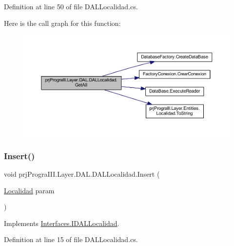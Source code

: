 Definition at line 50 of file D\+A\+L\+Localidad.\+cs.

Here is the call graph for this function\+:
\nopagebreak
\begin{figure}[H]
\begin{center}
\leavevmode
\includegraphics[width=350pt]{classprj_progra_i_i_i_1_1_layer_1_1_d_a_l_1_1_d_a_l_localidad_aeac57d97dd6728e382c3b52a8ab551d3_cgraph}
\end{center}
\end{figure}
\hypertarget{classprj_progra_i_i_i_1_1_layer_1_1_d_a_l_1_1_d_a_l_localidad_ac4a6e2c416a8372500396dcdb78a9f90}{}\label{classprj_progra_i_i_i_1_1_layer_1_1_d_a_l_1_1_d_a_l_localidad_ac4a6e2c416a8372500396dcdb78a9f90} 
\subsubsection{\texorpdfstring{Insert()}{Insert()}}
{\footnotesize\ttfamily void prj\+Progra\+I\+I\+I.\+Layer.\+D\+A\+L.\+D\+A\+L\+Localidad.\+Insert (\begin{DoxyParamCaption}\item[{\hyperlink{classprj_progra_i_i_i_1_1_layer_1_1_entities_1_1_localidad}{Localidad}}]{param }\end{DoxyParamCaption})}



Implements \hyperlink{interface_interfaces_1_1_i_d_a_l_localidad_a777e6b126a740cc546824c33af5ebd99}{Interfaces.\+I\+D\+A\+L\+Localidad}.



Definition at line 15 of file D\+A\+L\+Localidad.\+cs.

